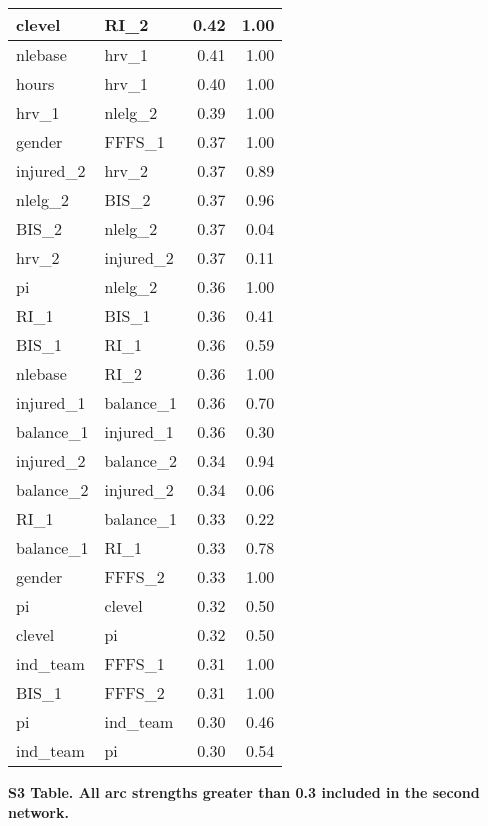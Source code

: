 \documentclass[
]{article}
\begin{document}
\begin{longtable}[t]{l|l|r|r}
\hline
clevel & RI\_2 & 0.42 & 1.00\\
\hline
nlebase & hrv\_1 & 0.41 & 1.00\\
\hline
hours & hrv\_1 & 0.40 & 1.00\\
\hline
hrv\_1 & nlelg\_2 & 0.39 & 1.00\\
\hline
gender & FFFS\_1 & 0.37 & 1.00\\
\hline
injured\_2 & hrv\_2 & 0.37 & 0.89\\
\hline
nlelg\_2 & BIS\_2 & 0.37 & 0.96\\
\hline
BIS\_2 & nlelg\_2 & 0.37 & 0.04\\
\hline
hrv\_2 & injured\_2 & 0.37 & 0.11\\
\hline
pi & nlelg\_2 & 0.36 & 1.00\\
\hline
RI\_1 & BIS\_1 & 0.36 & 0.41\\
\hline
BIS\_1 & RI\_1 & 0.36 & 0.59\\
\hline
nlebase & RI\_2 & 0.36 & 1.00\\
\hline
injured\_1 & balance\_1 & 0.36 & 0.70\\
\hline
balance\_1 & injured\_1 & 0.36 & 0.30\\
\hline
injured\_2 & balance\_2 & 0.34 & 0.94\\
\hline
balance\_2 & injured\_2 & 0.34 & 0.06\\
\hline
RI\_1 & balance\_1 & 0.33 & 0.22\\
\hline
balance\_1 & RI\_1 & 0.33 & 0.78\\
\hline
gender & FFFS\_2 & 0.33 & 1.00\\
\hline
pi & clevel & 0.32 & 0.50\\
\hline
clevel & pi & 0.32 & 0.50\\
\hline
ind\_team & FFFS\_1 & 0.31 & 1.00\\
\hline
BIS\_1 & FFFS\_2 & 0.31 & 1.00\\
\hline
pi & ind\_team & 0.30 & 0.46\\
\hline
ind\_team & pi & 0.30 & 0.54\\
\hline
\end{longtable}

\clearpage
\newpage

\textbf{S3 Table. All arc strengths greater than 0.3 included in the second network.}
\end{document}
